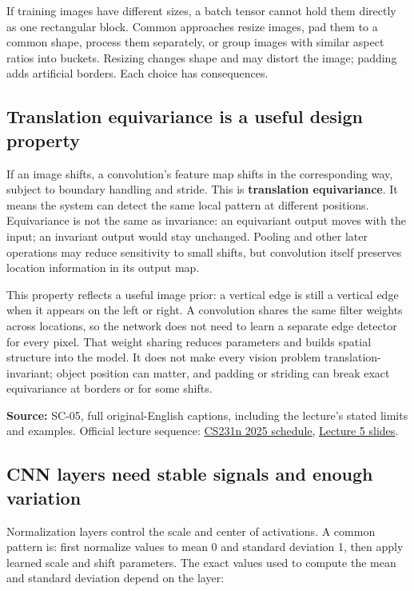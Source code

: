 If training images have different sizes, a batch tensor cannot hold them directly as one rectangular block. Common approaches resize images, pad them to a common shape, process them separately, or group images with similar aspect ratios into buckets. Resizing changes shape and may distort the image; padding adds artificial borders. Each choice has consequences.

\subsection{Translation equivariance is a useful design property}\label{04-visual-computing-ii-ch031-translation-equivariance-is-a-useful-design-property}

If an image shifts, a convolution's feature map shifts in the corresponding way, subject to boundary handling and stride. This is \textbf{translation equivariance}. It means the system can detect the same local pattern at different positions. Equivariance is not the same as invariance: an equivariant output moves with the input; an invariant output would stay unchanged. Pooling and other later operations may reduce sensitivity to small shifts, but convolution itself preserves location information in its output map.

This property reflects a useful image prior: a vertical edge is still a vertical edge when it appears on the left or right. A convolution shares the same filter weights across locations, so the network does not need to learn a separate edge detector for every pixel. That weight sharing reduces parameters and builds spatial structure into the model. It does not make every vision problem translation-invariant; object position can matter, and padding or striding can break exact equivariance at borders or for some shifts.

\textbf{Source:} SC-05, full original-English captions, including the lecture's stated limits and examples. Official lecture sequence: \href{https://cs231n.stanford.edu/2025/schedule.html}{CS231n 2025 schedule}, \href{https://cs231n.stanford.edu/slides/2025/lecture_5.pdf}{Lecture 5 slides}.

\subsection{CNN layers need stable signals and enough variation}\label{04-visual-computing-ii-ch031-cnn-layers-need-stable-signals-and-enough-variation}

Normalization layers control the scale and center of activations. A common pattern is: first normalize values to mean 0 and standard deviation 1, then apply learned scale and shift parameters. The exact values used to compute the mean and standard deviation depend on the layer:

